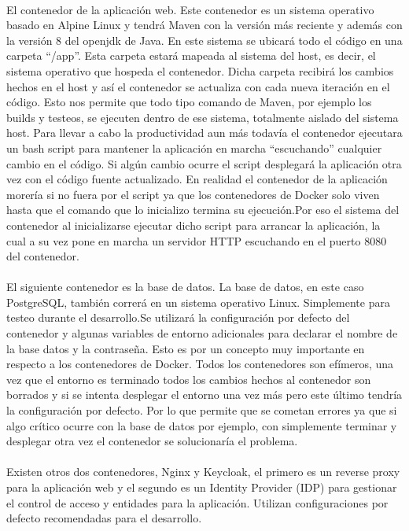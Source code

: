 \paragraph{}
El contenedor de la aplicación web. Este contenedor es un sistema operativo basado en Alpine Linux y tendrá Maven con la versión más reciente y además con la versión 8 del openjdk de Java. En este sistema se ubicará todo el código en una carpeta “/app”. Esta carpeta estará mapeada al sistema del host, es decir, el sistema operativo que hospeda el contenedor. Dicha carpeta recibirá los cambios hechos en el host y así el contenedor se actualiza con cada nueva iteración en el código. Esto nos permite que todo tipo comando de Maven, por ejemplo los builds y testeos,  se ejecuten dentro de ese sistema, totalmente aislado del sistema host.
Para llevar a cabo la productividad aun más todavía el contenedor ejecutara un bash script para mantener la aplicación en marcha “escuchando” cualquier cambio en el código. Si algún cambio ocurre el script desplegará la aplicación otra vez con el código fuente actualizado. En realidad el contenedor de la aplicación morería si no fuera por el script ya que los contenedores de Docker solo viven hasta que el comando que lo inicializo termina su ejecución.Por eso el sistema del contenedor al inicializarse ejecutar dicho script para arrancar la aplicación, la cual a su vez pone en marcha un servidor HTTP escuchando en el puerto 8080 del contenedor.

\paragraph{}
El siguiente contenedor es la base de datos. La base de datos, en este caso PostgreSQL, también correrá en un sistema operativo Linux. Simplemente para testeo durante el desarrollo.Se utilizará la configuración por defecto del contenedor y algunas variables de entorno adicionales para declarar el nombre de la base datos y la contraseña. Esto es por un concepto muy importante en respecto a los contenedores de Docker. Todos los contenedores son efímeros, una vez que el entorno  es terminado todos los cambios hechos al contenedor son borrados y si se intenta desplegar el entorno una vez más pero este último tendría la configuración por defecto. Por lo que permite que se cometan errores ya que si algo crítico ocurre con la base de datos por ejemplo, con simplemente terminar y desplegar otra vez el contenedor se solucionaría el problema.

\paragraph{}
Existen otros dos contenedores, Nginx y Keycloak, el primero es un reverse proxy para la aplicación web y el segundo es un Identity Provider (IDP) para gestionar el control de acceso y entidades para la aplicación. Utilizan configuraciones por defecto recomendadas para el desarrollo.


